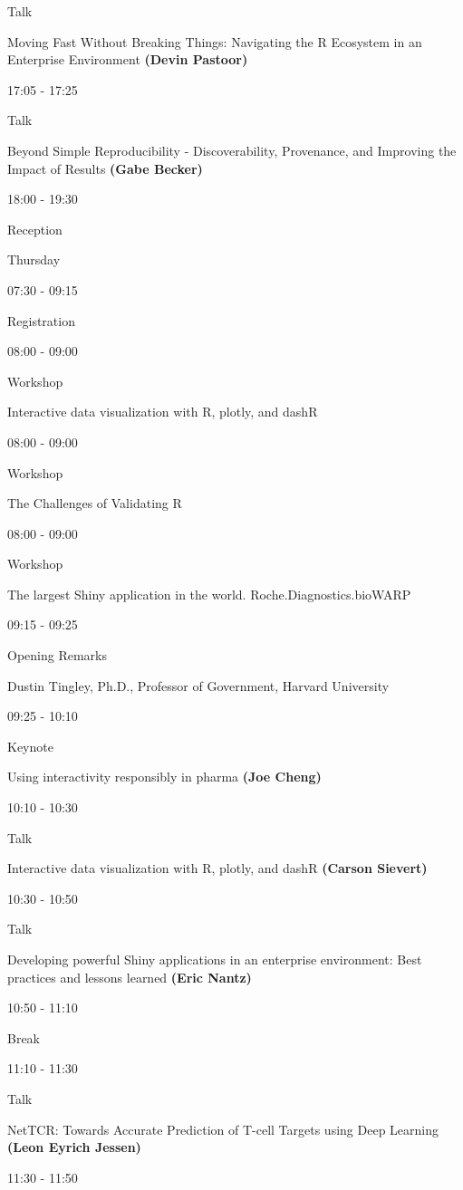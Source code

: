 \documentclass[]{book}
\theoremstyle{definition}
\theoremstyle{definition}
\theoremstyle{definition}
\theoremstyle{remark}
\begin{document}
Talk

Moving Fast Without Breaking Things: Navigating the R Ecosystem in an
Enterprise Environment \textbf{(Devin Pastoor)}

17:05 - 17:25

Talk

Beyond Simple Reproducibility - Discoverability, Provenance, and
Improving the Impact of Results \textbf{(Gabe Becker)}

18:00 - 19:30

Reception

Thursday

07:30 - 09:15

Registration

08:00 - 09:00

Workshop

Interactive data visualization with R, plotly, and dashR

08:00 - 09:00

Workshop

The Challenges of Validating R

08:00 - 09:00

Workshop

The largest Shiny application in the world. Roche.Diagnostics.bioWARP

09:15 - 09:25

Opening Remarks

Dustin Tingley, Ph.D., Professor of Government, Harvard University

09:25 - 10:10

Keynote

Using interactivity responsibly in pharma \textbf{(Joe Cheng)}

10:10 - 10:30

Talk

Interactive data visualization with R, plotly, and dashR \textbf{(Carson
Sievert)}

10:30 - 10:50

Talk

Developing powerful Shiny applications in an enterprise environment:
Best practices and lessons learned \textbf{(Eric Nantz)}

10:50 - 11:10

Break

11:10 - 11:30

Talk

NetTCR: Towards Accurate Prediction of T-cell Targets using Deep
Learning \textbf{(Leon Eyrich Jessen)}

11:30 - 11:50
\end{document}
